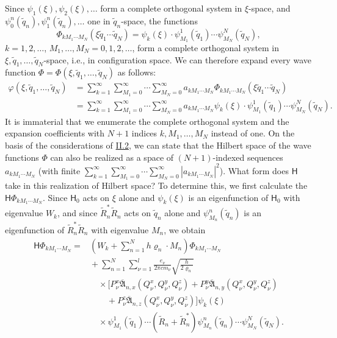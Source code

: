 \documentclass[fontsize=13pt,twoside,openany,headings=normal,parskip=false,bookmarkpackage=false,DIV=calc]{scrbook}
\begin{document}
Since $\psi_1(\xi),\psi_2(\xi),\ldots$ form a complete orthogonal system in $\xi$-space, and $\psi_0^n(\widetilde q_n),\psi_1^n(\widetilde q_n),\ldots$ one in $\widetilde q_n$-space, the functions
\[
 \Phi_{kM_1\cdots M_N}(\xi\widetilde q_1\cdots\widetilde q_N)
 =\psi_k(\xi)\cdot\psi_{M_1}^1(\widetilde q_1)\cdots\psi_{M_N}^N(\widetilde q_N),
\]
$k=1,2,\ldots$, $M_1,\ldots,M_N=0,1,2,\ldots$, form a complete orthogonal system in $\xi,\widetilde q_1,\ldots,\widetilde q_N$-space, i.e., in configuration space. We can therefore expand every wave function $\Phi=\Phi(\xi,\widetilde q_1,\ldots,\widetilde q_N)$ as follows:
\begin{align*}
 \varphi(\xi,\widetilde q_1,\ldots,\widetilde q_N)
 &=\sum_{k=1}^{\infty}\sum_{M_1=0}^{\infty}\cdots\sum_{M_N=0}^{\infty}
 a_{kM_1\cdots M_N}\Phi_{kM_1\cdots M_N}(\xi\widetilde q_1\cdots\widetilde q_N)\\
 &=\sum_{k=1}^{\infty}\sum_{M_1=0}^{\infty}\cdots\sum_{M_N=0}^{\infty}
 a_{kM_1\cdots M_N}\psi_k(\xi)\cdot\psi_{M_1}^1(\widetilde q_1)\cdots\psi_{M_N}^N(\widetilde q_N).
\end{align*}
It is immaterial that we enumerate the complete orthogonal system and the expansion coefficients with $N+1$ indices $k,M_1,\ldots,M_N$ instead of one. On the basis of the considerations of \hyperref[sec:II.2]{II.2}, we can state that the Hilbert space of the wave functions $\Phi$ can also be realized as a space of $(N+1)$-indexed sequences $a_{kM_1\cdots M_N}$ (with finite $\sum_{k=1}^{\infty}\sum_{M_1=0}^{\infty}\cdots\sum_{M_N=0}^{\infty}|a_{kM_1\cdots M_N}|^2$). What form does $\mathsf{H}$ take in this realization of Hilbert space? To determine this, we first calculate the $\mathsf{H}\Phi_{kM_1\cdots M_N}$. Since $\mathsf{H}_0$ acts on $\xi$ alone and $\psi_k(\xi)$ is an eigenfunction of $\mathsf{H}_0$ with eigenvalue $W_k$, and since $\widetilde R_n^*\widetilde R_n$ acts on $\widetilde q_n$ alone and $\psi_{M_n}^n(\widetilde q_n)$ \hypertarget{origpage-143}{}is an eigenfunction of $\widetilde R_n^*\widetilde R_n$ with eigenvalue $M_n$, we obtain
\begin{align*}
 \mathsf{H}\Phi_{kM_1\cdots M_N}
 ={}&\left(W_k+\sum_{n=1}^{N}h\varrho_n\cdot M_n\right)\Phi_{kM_1\cdots M_N}\\
 &{}+\sum_{n=1}^{N}\sum_{\nu=1}^{l}\frac{e_\nu}{2\pi cm_\nu}\sqrt{\frac h{2\varrho_n}}\\
 &\quad{}\times\bigl[P_\nu^x\overline{\mathfrak A}_{n,x}(Q_\nu^x,Q_\nu^y,Q_\nu^z)
 +P_\nu^y\overline{\mathfrak A}_{n,y}(Q_\nu^x,Q_\nu^y,Q_\nu^z)\\
 &\qquad{}+P_\nu^z\overline{\mathfrak A}_{n,z}(Q_\nu^x,Q_\nu^y,Q_\nu^z)\bigr]\psi_k(\xi)\\
 &\quad{}\times\psi_{M_1}^1(\widetilde q_1)\cdots
 (\widetilde R_n+\widetilde R_n^*)\psi_{M_n}^n(\widetilde q_n)\cdots\psi_{M_N}^N(\widetilde q_N).
\end{align*}
\end{document}
